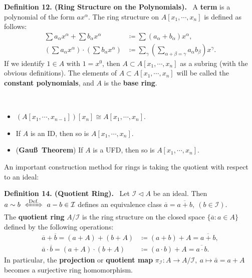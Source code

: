 \documentclass[12pt,a4paper,footinclude=true,headinclude=true]{scrbook} %
\newenvironment{proposition}[2][]
{\renewcommand\theinnercustomprop{#2}\innercustomprop[#1] 
\begin{mdframed}[backgroundcolor=gray!20]\ }
{\end{mdframed}\endinnercustomprop}
\newenvironment{definition}[2][Definition]
    { \begin{mdframed}[backgroundcolor=gray!20] \textbf{#1 #2.}\ }
    {  \end{mdframed}}
\begin{document}
\begin{definition}{12. (Ring Structure on the Polynomials)}
    A \textbf{term} is a polynomial of the form $ax^\alpha$. The ring structure on $A[x_1,\cdots,x_n]$ is defined as follows:
    \begin{align*}
        \sum a_\alpha x^\alpha+\sum b_\alpha x^\alpha
        &\coloneqq\sum(a_\alpha+b_\alpha)x^\alpha,\\
        (\sum a_\alpha x^\alpha)\cdot(\sum b_\alpha x^\alpha)
        &\coloneqq\sum_\gamma(\sum_{\alpha+\beta=\gamma}a_\alpha b_\beta)x^\gamma.
    \end{align*}
    If we identify $1\in A$ with $1=x^0$, then $A\subset A[x_1,\cdots,x_n]$ as a subring (with the obvious definitions). The elements of $A\subset A[x_1,\cdots,x_n]$ will be called the \textbf{constant polynomials}, and $A$ is the \textbf{base ring}.
\end{definition}

\begin{proposition}{13}
    \begin{itemize}
        \item[(a)] $(A[x_1,\cdots,x_{n-1}])[x_n]\cong A[x_1,\cdots,x_n]$.
        \item[(b)] If $A$ is an ID, then so is $A[x_1,\cdots,x_n]$.
        \item[(c)] (\textbf{Gau\ss\ Theorem}) If $A$ is a UFD, then so is $A[x_1,\cdots,x_n]$.
    \end{itemize}
\end{proposition}

An important construction method for rings is taking the quotient with respect to an ideal:
\begin{definition}{14. (Quotient Ring)}
    Let $\mathcal{I}\triangleleft A$ be an ideal. Then $a\sim b\ \xLeftrightarrow{\text{Def.}}\ a-b\in \mathcal{I}$ defines an equivalence class $\overline{a}=\overline{a+b},\ (b\in\mathcal{I})$. \\ The \textbf{quotient ring} $A/\mathcal{I}$ is the ring structure on the closed space $\{\overline{a}:a\in A\}$ defined by the following operations:
    \begin{align*}
        \overline{a}+\overline{b} = (a+A)+(b+A) &\coloneqq (a+b)+A =\overline{a+b}, \\ \overline{a}\cdot\overline{b} = (a+A)\cdot(b+A) &\coloneqq (a\cdot b)+A =\overline{a\cdot b}.
    \end{align*}
    In particular, the \textbf{projection} or \textbf{quotient map} $\pi_{\mathcal{I}}:A\to A/\mathcal{I},\ a\mapsto\bar{a}=a+A$ becomes a surjective ring homomorphism.
\end{definition}
\end{document}
